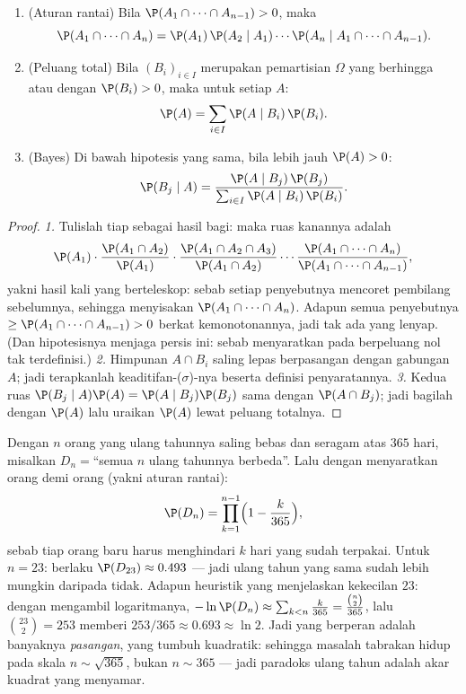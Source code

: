 \begin{theorem}\label{thm:b2:proba:bayes}
\leavevmode
\begin{enumerate}
\item (Aturan rantai) Bila $\P(A_1 \cap \dots \cap A_{n-1}) > 0$, maka
\[
\P(A_1 \cap \dots \cap A_n)
= \P(A_1)\,\P(A_2 \mid A_1)\cdots
\P(A_n \mid A_1 \cap \dots \cap A_{n-1}) .
\]
\item (Peluang total) Bila $(B_i)_{i \in I}$ merupakan pemartisian $\Omega$
yang berhingga atau  dengan $\P(B_i) > 0$, maka untuk setiap
 $A$:
\[
\P(A) = \sum_{i \in I} \P(A \mid B_i)\,\P(B_i) .
\]
\item (Bayes) Di bawah hipotesis yang sama, bila lebih jauh $\P(A) > 0$:
\[
\P(B_j \mid A)
= \frac{\P(A \mid B_j)\,\P(B_j)}
       {\sum_{i \in I} \P(A \mid B_i)\,\P(B_i)} .
\]
\end{enumerate}
\end{theorem}

\begin{proof}
\emph{1.} Tulislah tiap  sebagai hasil bagi:
maka ruas kanannya adalah
\[
\P(A_1)\cdot\frac{\P(A_1 \cap A_2)}{\P(A_1)}\cdot
\frac{\P(A_1 \cap A_2 \cap A_3)}{\P(A_1 \cap A_2)}\cdots
\frac{\P(A_1 \cap \dots \cap A_n)}{\P(A_1 \cap \dots \cap
A_{n-1})},
\]
yakni hasil kali yang berteleskop: sebab setiap penyebutnya mencoret
pembilang sebelumnya, sehingga menyisakan $\P(A_1 \cap \dots \cap A_n)$.
Adapun semua penyebutnya $\geq \P(A_1 \cap \dots \cap A_{n-1}) >
0$ berkat kemonotonannya, jadi tak ada yang lenyap. (Dan hipotesisnya
menjaga persis ini: sebab menyaratkan pada  berpeluang
nol tak terdefinisi.)
\emph{2.} Himpunan $A \cap B_i$ saling lepas berpasangan dengan gabungan
$A$; jadi terapkanlah keaditifan-($\sigma$)-nya beserta definisi
penyaratannya.
\emph{3.} Kedua ruas $\P(B_j \mid A)\P(A) = \P(A \mid
B_j)\P(B_j)$ sama dengan $\P(A \cap B_j)$; jadi bagilah dengan $\P(A)$ lalu uraikan
$\P(A)$ lewat peluang totalnya.
\end{proof}

\begin{example}\label{ex:b2:proba:birthday}
Dengan $n$ orang yang ulang tahunnya saling bebas dan seragam
atas $365$ hari, misalkan $D_n = {}$``semua $n$ ulang tahunnya berbeda''.
Lalu dengan menyaratkan orang demi orang (yakni aturan rantai):
\[
\P(D_n) = \prod_{k=1}^{n-1}\Bigl(1 - \frac{k}{365}\Bigr),
\]
sebab tiap orang baru harus menghindari $k$ hari yang sudah terpakai.
Untuk $n = 23$: berlaku $\P(D_{23}) \approx 0.493$ --- jadi ulang tahun
yang sama sudah lebih mungkin daripada tidak. Adapun heuristik yang
menjelaskan kekecilan $23$: dengan mengambil logaritmanya, $-\ln
\P(D_n) \approx \sum_{k<n}\frac k{365} =
\frac{\binom n2}{365}$, lalu $\binom{23}2 = 253$ memberi
$253/365 \approx 0.693 \approx \ln 2$. Jadi yang berperan adalah
banyaknya \emph{pasangan}, yang tumbuh kuadratik: sehingga masalah
tabrakan hidup pada skala $n \sim \sqrt{365}$, bukan $n \sim
365$ --- jadi paradoks ulang tahun adalah akar kuadrat yang menyamar.
\end{example}

